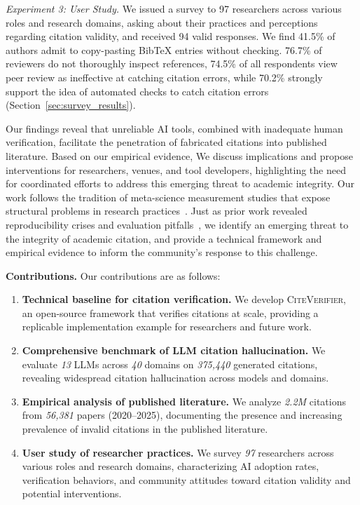\textit{Experiment 3: User Study.}
We issued a survey to 97 researchers across various roles  and research domains, asking about their practices and perceptions regarding citation validity, and received 94 valid responses. We find 41.5\% of authors admit to copy-pasting BibTeX entries without checking. 76.7\% of reviewers do not thoroughly inspect references, 74.5\% of all respondents view peer review as ineffective at catching citation errors, while 70.2\% strongly support the idea of automated checks to catch citation errors (Section~\ref{sec:survey_results}).

Our findings reveal that unreliable AI tools, combined with inadequate human verification, facilitate the penetration of fabricated citations into published literature. Based on our empirical evidence, We discuss implications and propose interventions for researchers, venues, and tool developers, highlighting the need for coordinated efforts to address this emerging threat to academic integrity.
Our work follows the tradition of meta-science measurement studies that expose structural problems in research practices~\cite{baker2016reproducibility,ioannidis2005most,rossow2012prudent,schloegel2025confusing}.
Just as prior work revealed reproducibility crises and evaluation pitfalls~\cite{baker2016reproducibility,rossow2012prudent}, we identify an emerging threat to the integrity of academic citation, and provide a technical framework and empirical evidence to inform the community's response to this challenge.

\noindent
\textbf{Contributions.}
Our contributions are as follows:

\begin{enumerate}
    \item \textbf{Technical baseline for citation verification.} We develop \textsc{CiteVerifier}, an open-source framework that verifies citations at scale, providing a replicable implementation example for researchers and future work.

    \item \textbf{Comprehensive benchmark of LLM citation hallucination.} We evaluate \textit{13} LLMs across \textit{40} domains on \textit{375,440} generated citations, revealing widespread citation hallucination across models and domains.
    
    \item \textbf{Empirical analysis of published literature.} We analyze \textit{2.2M} citations from \textit{56,381} papers (2020--2025), documenting the presence and increasing prevalence of invalid citations in the published literature.
    
    \item \textbf{User study of researcher practices.} We survey \textit{97} researchers across various roles and research domains, characterizing AI adoption rates, verification behaviors, and community attitudes toward citation validity and potential interventions.
 
\end{enumerate}


